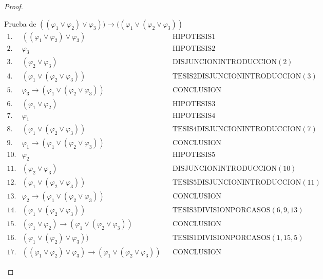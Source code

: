 \begin{proof}
\begin{enumerate}[(1)]
        \PN Prueba de $((\varphi_{1} \vee \varphi_{2}) \vee \varphi_{3})) \rightarrow ((\varphi_{1} \vee (\varphi_{2}
        \vee \varphi_{3}))$
        \[
          \begin{array}{llll}
            1. & ((\varphi_{1} \vee \varphi_{2}) \vee \varphi_{3}) && \text{HIPOTESIS1} \\
            2. & \varphi_{3} && \text{HIPOTESIS2} \\
            3. & (\varphi_{2} \vee \varphi_{3}) && \text{DISJUNCIONINTRODUCCION}(2) \\
            4. & (\varphi_{1} \vee (\varphi_{2} \vee \varphi_{3})) && \text{TESIS2DISJUNCIONINTRODUCCION}(3) \\
            5. & \varphi_{3} \rightarrow (\varphi_{1} \vee (\varphi_{2} \vee \varphi_{3})) && \text{CONCLUSION} \\
            6. & (\varphi_{1} \vee \varphi_{2}) && \text{HIPOTESIS3} \\
            7. & \varphi_{1} && \text{HIPOTESIS4} \\
            8. & (\varphi_{1} \vee (\varphi_{2} \vee \varphi_{3})) && \text{TESIS4DISJUNCIONINTRODUCCION}(7) \\
            9. & \varphi_{1} \rightarrow (\varphi_{1} \vee (\varphi_{2} \vee \varphi_{3})) && \text{CONCLUSION} \\
            10. & \varphi_{2} && \text{HIPOTESIS5} \\
            11. & (\varphi_{2} \vee \varphi_{3}) && \text{DISJUNCIONINTRODUCCION}(10) \\
            12. & (\varphi_{1} \vee (\varphi_{2} \vee \varphi_{3})) && \text{TESIS5DISJUNCIONINTRODUCCION}(11) \\
            13. & \varphi_{2} \rightarrow (\varphi_{1} \vee (\varphi_{2} \vee \varphi_{3})) && \text{CONCLUSION} \\
            14. & (\varphi_{1} \vee (\varphi_{2} \vee \varphi_{3})) && \text{TESIS3DIVISIONPORCASOS}(6,9,13) \\
            15. & (\varphi_{1} \vee \varphi_{2}) \rightarrow (\varphi_{1} \vee (\varphi_{2} \vee \varphi_{3})) &&
              \text{CONCLUSION} \\
            16. & (\varphi_{1} \vee (\varphi_{2}) \vee \varphi_{3})) && \text{TESIS1DIVISIONPORCASOS}(1,15,5) \\
            17. & ((\varphi_{1} \vee \varphi_{2}) \vee \varphi_{3}) \rightarrow (\varphi_{1} \vee (\varphi_{2} \vee
              \varphi_{3})) && \text{CONCLUSION}
          \end{array}
        \]


\end{enumerate}
\end{proof}
